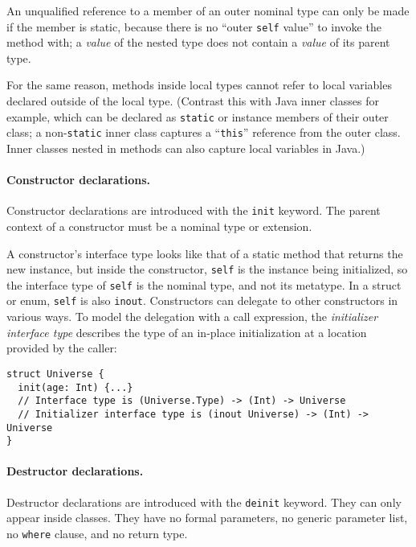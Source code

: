 \documentclass[../generics]{subfiles}
\begin{document}
An unqualified reference to a member of an outer nominal type can only be made if the member is static, because there is no ``outer \texttt{self} value'' to invoke the method with; a \emph{value} of the nested type does not contain a \emph{value} of its parent type.

For the same reason, methods inside local types cannot refer to local variables declared outside of the local type. (Contrast this with Java inner classes for example, which can be declared as \texttt{static} or instance members of their outer class; a non-\texttt{static} inner class captures a ``\texttt{this}'' reference from the outer class. Inner classes nested in methods can also capture local variables in Java.)

\paragraph{Constructor declarations.}
Constructor declarations are introduced with the \texttt{init} keyword. The parent context of a constructor must be a nominal type or extension.

A constructor's interface type looks like that of a static method that returns the new instance, but inside the constructor, \texttt{self} is the instance being initialized, so the interface type of \texttt{self} is the nominal type, and not its metatype. In a struct or enum, \texttt{self} is also \texttt{inout}. Constructors can delegate to other constructors in various ways. To model the delegation with a call expression, the \emph{initializer interface type} describes the type of an in-place initialization at a location provided by the caller:
\begin{Verbatim}
struct Universe {
  init(age: Int) {...}
  // Interface type is (Universe.Type) -> (Int) -> Universe
  // Initializer interface type is (inout Universe) -> (Int) -> Universe
}
\end{Verbatim}

\paragraph{Destructor declarations.}
Destructor declarations are introduced with the \texttt{deinit} keyword. They can only appear inside classes. They have no formal parameters, no generic parameter list, no \texttt{where} clause, and no return type.
\end{document}
